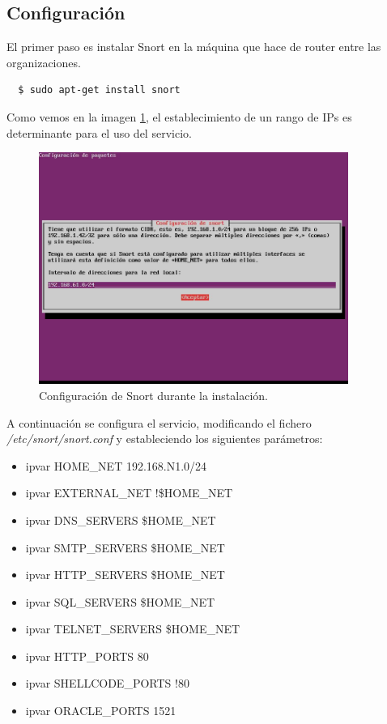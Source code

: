 \documentclass[a4,12pt,onecolum]{article}
\begin{document}
\subsection{Configuración}

El primer paso es instalar Snort en la máquina que hace de router entre las organizaciones.

\begin{verbatim}
  $ sudo apt-get install snort
\end{verbatim}

Como vemos en la imagen \ref{fig:snort1}, el establecimiento de un rango de IPs es determinante para el uso del servicio.

\begin{figure}[htbp]
\centering
\includegraphics[width=0.9\textwidth]{./images/SnortInstalacion.jpg}
\caption{Configuración de Snort durante la instalación.}
\label{fig:snort1}
\end{figure}

A continuación se configura el servicio, modificando el fichero \emph{/etc/snort/snort.conf} y estableciendo los siguientes parámetros:

\begin{itemize}
  \item ipvar HOME\_NET 192.168.N1.0/24
  \item ipvar EXTERNAL\_NET !\$HOME\_NET
  \item ipvar DNS\_SERVERS \$HOME\_NET
  \item ipvar SMTP\_SERVERS    \$HOME\_NET
  \item ipvar HTTP\_SERVERS    \$HOME\_NET
  \item ipvar SQL\_SERVERS     \$HOME\_NET
  \item ipvar TELNET\_SERVERS  \$HOME\_NET
  \item ipvar HTTP\_PORTS      80
  \item ipvar SHELLCODE\_PORTS !80
  \item ipvar ORACLE\_PORTS    1521
\end{itemize}
\end{document}

